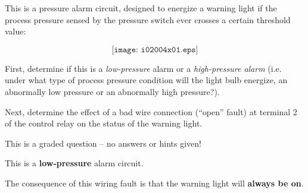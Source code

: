 

This is a pressure alarm circuit, designed to energize a warning light if the process pressure sensed by the pressure switch ever crosses a certain threshold value:

$$\texttt{[image: i02004x01.eps]}$$

First, determine if this is a {\it low-pressure} alarm or a {\it high-pressure alarm} (i.e. under what type of process pressure condition will the light bulb energize, an abnormally low pressure or an abnormally high pressure?).

\vskip 20pt

Next, determine the effect of a bad wire connection (``open'' fault) at terminal 2 of the control relay on the status of the warning light.

\vfil 

\eject






This is a graded question -- no answers or hints given!







This is a {\bf low-pressure} alarm circuit.

\vskip 10pt

The consequence of this wiring fault is that the warning light will {\bf always be on}.





